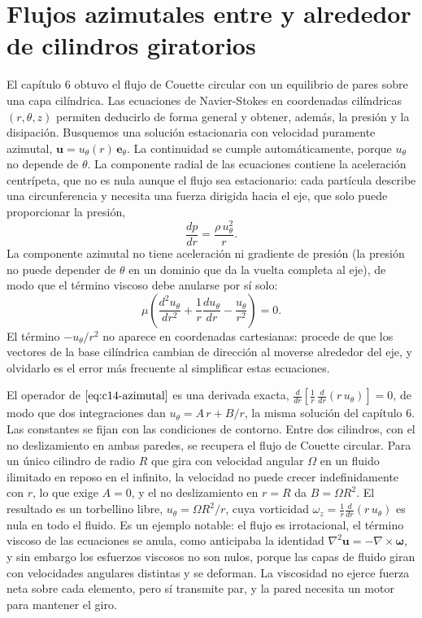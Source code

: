 \documentclass[10pt,openany]{book}
\begin{document}
\section{Flujos azimutales entre y alrededor de cilindros giratorios}

El capítulo 6 obtuvo el flujo de Couette circular con un equilibrio de pares sobre una capa cilíndrica. Las ecuaciones de Navier-Stokes en coordenadas cilíndricas \((r, \theta, z)\) permiten deducirlo de forma general y obtener, además, la presión y la disipación. Busquemos una solución estacionaria con velocidad puramente azimutal, \(\mathbf{u} = u_\theta(r)\,\mathbf{e}_\theta\). La continuidad se cumple automáticamente, porque \(u_\theta\) no depende de \(\theta\). La componente radial de las ecuaciones contiene la aceleración centrípeta, que no es nula aunque el flujo sea estacionario: cada partícula describe una circunferencia y necesita una fuerza dirigida hacia el eje, que solo puede proporcionar la presión,
\begin{equation}
\frac{dp}{dr} = \frac{\rho\,u_\theta^{2}}{r}. \label{eq:c14-radial}
\end{equation}
La componente azimutal no tiene aceleración ni gradiente de presión (la presión no puede depender de \(\theta\) en un dominio que da la vuelta completa al eje), de modo que el término viscoso debe anularse por sí solo:
\begin{equation}
\mu\left(\frac{d^{2}u_\theta}{dr^{2}} + \frac{1}{r}\frac{du_\theta}{dr} - \frac{u_\theta}{r^{2}}\right) = 0. \label{eq:c14-azimutal}
\end{equation}
El término \(-u_\theta/r^{2}\) no aparece en coordenadas cartesianas: procede de que los vectores de la base cilíndrica cambian de dirección al moverse alrededor del eje, y olvidarlo es el error más frecuente al simplificar estas ecuaciones.

El operador de \(\eqref{eq:c14-azimutal}\) es una derivada exacta, \(\frac{d}{dr}\!\left[\frac{1}{r}\,\frac{d}{dr}\left(r\,u_\theta\right)\right] = 0\), de modo que dos integraciones dan \(u_\theta = A\,r + B/r\), la misma solución del capítulo 6. Las constantes se fijan con las condiciones de contorno. Entre dos cilindros, con el no deslizamiento en ambas paredes, se recupera el flujo de Couette circular. Para un único cilindro de radio \(R\) que gira con velocidad angular \(\Omega\) en un fluido ilimitado en reposo en el infinito, la velocidad no puede crecer indefinidamente con \(r\), lo que exige \(A = 0\), y el no deslizamiento en \(r = R\) da \(B = \Omega R^{2}\). El resultado es un torbellino libre, \(u_\theta = \Omega R^{2}/r\), cuya vorticidad \(\omega_z = \frac{1}{r}\frac{d}{dr}(r\,u_\theta)\) es nula en todo el fluido. Es un ejemplo notable: el flujo es irrotacional, el término viscoso de las ecuaciones se anula, como anticipaba la identidad \(\nabla^{2}\mathbf{u} = -\nabla\times\boldsymbol{\omega}\), y sin embargo los esfuerzos viscosos no son nulos, porque las capas de fluido giran con velocidades angulares distintas y se deforman. La viscosidad no ejerce fuerza neta sobre cada elemento, pero sí transmite par, y la pared necesita un motor para mantener el giro.
\end{document}
